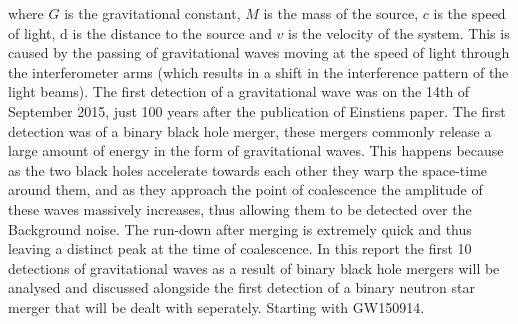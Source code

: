 \documentclass[]{article}
\begin{document}
where $G$ is the gravitational constant, $M$ is the mass of the source, $c$ is the speed of light,
d is the distance to the source and $v$ is the velocity of the system.
\newline
This is caused by the passing of gravitational waves moving at the speed of light
through the
interferometer arms (which results in a shift in the interference pattern of the light beams).
The first detection of a gravitational wave was on the 14th of
September 2015, just 100 years after the publication of Einstiens paper.
The first detection was of a binary black hole merger, these mergers commonly
release a large amount of energy in the form of gravitational waves. This happens
because as the two black holes accelerate towards each other they warp the
space-time around them, and as they approach the point of coalescence the amplitude
of these waves massively increases, thus allowing them to be detected over the Background
noise. The run-down after merging is extremely quick and thus leaving a distinct peak
at the time of coalescence. In this report the first 10 detections of gravitational waves
as a result of binary black hole mergers will be analysed and discussed alongside the first detection
of a binary neutron star merger that will be dealt with seperately. Starting with GW150914.
\end{document}

